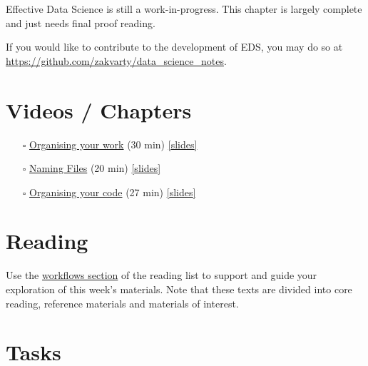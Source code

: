 \documentclass[
  12pt,
]{book}
\providecommand{\tightlist}{%
  \setlength{\itemsep}{0pt}\setlength{\parskip}{0pt}}
\begin{document}
Effective Data Science is still a work-in-progress. This chapter is largely complete and just needs final proof reading.

If you would like to contribute to the development of EDS, you may do so at \url{https://github.com/zakvarty/data_science_notes}.

\hypertarget{videos-chapters}{%
\section{Videos / Chapters}\label{videos-chapters}}

\begin{itemize}
\tightlist
\item[$\square$]
  \href{https://imperial.cloud.panopto.eu/Panopto/Pages/Viewer.aspx?id=eb93df23-751e-4f79-8397-af72013634d0}{Organising your work} (30 min) \href{https://github.com/zakvarty/effective-data-science-slides-2022/raw/main/01-01-organising-your-work/01-01-organising-your-work.pdf}{{[}slides{]}}
\item[$\square$]
  \href{https://imperial.cloud.panopto.eu/Panopto/Pages/Viewer.aspx?id=0f676fbc-3de6-490a-ac38-af7200ee1396}{Naming Files} (20 min) \href{https://github.com/zakvarty/effective-data-science-slides-2022/raw/main/01-02-naming-files/01-02-naming-files.pdf}{{[}slides{]}}
\item[$\square$]
  \href{https://imperial.cloud.panopto.eu/Panopto/Pages/Viewer.aspx?id=572c25c0-4cac-4260-97fe-af7200ee1358}{Organising your code} (27 min) \href{https://github.com/zakvarty/effective-data-science-slides-2022/raw/main/01-03-organising-your-code/01-03-organising-your-code.pdf}{{[}slides{]}}
\end{itemize}

\hypertarget{reading}{%
\section{Reading}\label{reading}}

Use the \protect\hyperlink{workflows-reading}{workflows section} of the reading list to support and guide your exploration of this week's materials. Note that these texts are divided into core reading, reference materials and materials of interest.

\hypertarget{tasks}{%
\section{Tasks}\label{tasks}}
\end{document}
